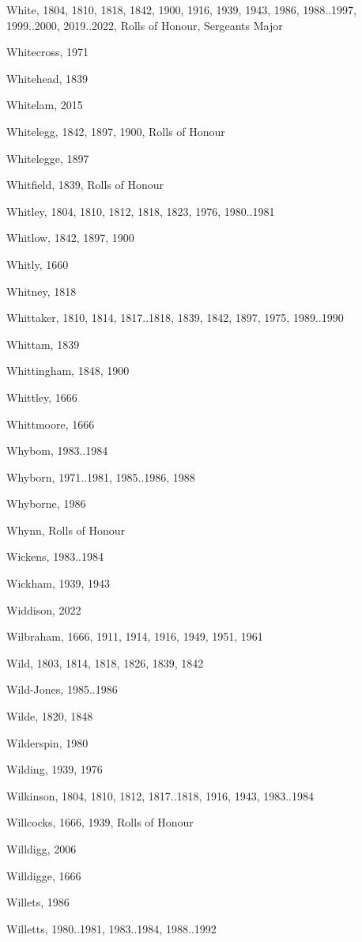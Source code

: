 {\begin{theindex}
\item White, 1804, 1810, 1818, 1842, 1900, 1916, 1939, 1943, 1986, 1988..1997, 1999..2000, 2019..2022, Rolls of Honour, Sergeants Major
\item Whitecross, 1971
\item Whitehead, 1839
\item Whitelam, 2015
\item Whitelegg, 1842, 1897, 1900, Rolls of Honour
\item Whitelegge, 1897
\item Whitfield, 1839, Rolls of Honour
\item Whitley, 1804, 1810, 1812, 1818, 1823, 1976, 1980..1981
\item Whitlow, 1842, 1897, 1900
\item Whitly, 1660
\item Whitney, 1818
\item Whittaker, 1810, 1814, 1817..1818, 1839, 1842, 1897, 1975, 1989..1990
\item Whittam, 1839
\item Whittingham, 1848, 1900
\item Whittley, 1666
\item Whittmoore, 1666
\item Whybom, 1983..1984
\item Whyborn, 1971..1981, 1985..1986, 1988
\item Whyborne, 1986
\item Whynn, Rolls of Honour
\item Wickens, 1983..1984
\item Wickham, 1939, 1943
\item Widdison, 2022
\item Wilbraham, 1666, 1911, 1914, 1916, 1949, 1951, 1961
\item Wild, 1803, 1814, 1818, 1826, 1839, 1842
\item Wild-Jones, 1985..1986
\item Wilde, 1820, 1848
\item Wilderspin, 1980
\item Wilding, 1939, 1976
\item Wilkinson, 1804, 1810, 1812, 1817..1818, 1916, 1943, 1983..1984
\item Willcocks, 1666, 1939, Rolls of Honour
\item Willdigg, 2006
\item Willdigge, 1666
\item Willets, 1986
\item Willetts, 1980..1981, 1983..1984, 1988..1992

\end{theindex}}
